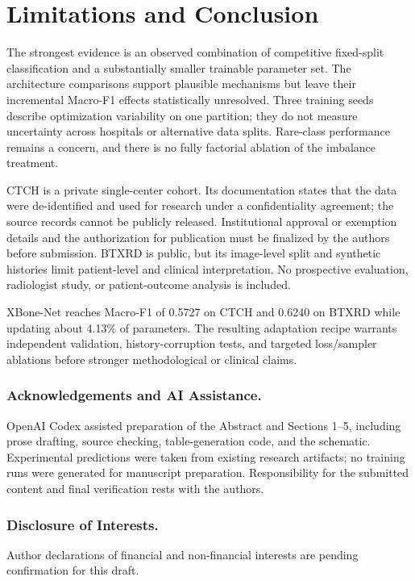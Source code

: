 \documentclass{llncs}
\begin{document}
\section{Limitations and Conclusion}
The strongest evidence is an observed combination of competitive fixed-split classification and a substantially smaller trainable parameter set. The architecture comparisons support plausible mechanisms but leave their incremental Macro-F1 effects statistically unresolved. Three training seeds describe optimization variability on one partition; they do not measure uncertainty across hospitals or alternative data splits. Rare-class performance remains a concern, and there is no fully factorial ablation of the imbalance treatment.

CTCH is a private single-center cohort. Its documentation states that the data were de-identified and used for research under a confidentiality agreement; the source records cannot be publicly released. Institutional approval or exemption details and the authorization for publication must be finalized by the authors before submission. BTXRD is public, but its image-level split and synthetic histories limit patient-level and clinical interpretation. No prospective evaluation, radiologist study, or patient-outcome analysis is included.

XBone-Net reaches Macro-F1 of 0.5727 on CTCH and 0.6240 on BTXRD while updating about 4.13\% of parameters. The resulting adaptation recipe warrants independent validation, history-corruption tests, and targeted loss/sampler ablations before stronger methodological or clinical claims.

\subsubsection{Acknowledgements and AI Assistance.}
OpenAI Codex assisted preparation of the Abstract and Sections 1--5, including prose drafting, source checking, table-generation code, and the schematic. Experimental predictions were taken from existing research artifacts; no training runs were generated for manuscript preparation. Responsibility for the submitted content and final verification rests with the authors.

\subsubsection{Disclosure of Interests.}
Author declarations of financial and non-financial interests are pending confirmation for this draft.



\end{document}
